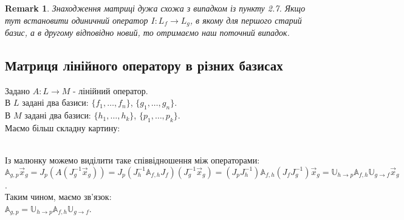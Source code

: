 \documentclass[a4paper, 10pt]{article}
\theoremstyle{theoremdd}
\newtheorem{remark}[theorem]{Remark}
\begin{document}
\begin{remark}
Знаходження матриці дужа схожа з випадком із пункту 2.7. Якщо тут встановити одиничний оператор $I: L_f \to L_g$, в якому для першого старий базис, а в другому відповідно новий, то отримаємо наш поточний випадок.
\end{remark}

\subsection{Матриця лінійного оператору в різних базисах}
Задано $A: L \to M$ - лінійний оператор.\\
В $L$ задані два базиси: $\{f_1,\dots, f_n\}$, $\{g_1, \dots, g_n\}$.\\
В $M$ задані два базиси: $\{h_1,\dots, h_k\}$, $\{p_1, \dots, p_k\}$.\\
Маємо більш складну картину:\\
\\
Із малюнку можемо виділити таке співвідношення між операторами:\\
$\mathbb{A}_{g,p} \vec{x}_g = J_p(A(J_g^{-1} \vec{x}_g)) = J_p(J_h^{-1} \mathbb{A}_{f,h} J_f)(J_g^{-1} \vec{x}_g) = (J_p J_h^{-1}) \mathbb{A}_{f,h} (J_f J_g^{-1})\vec{x}_g = \mathbb{U}_{h \to p} \mathbb{A}_{f,h} \mathbb{U}_{g \to f} \vec{x}_g$.\\
Таким чином, маємо зв'язок:\\
$\mathbb{A}_{g,p} = \mathbb{U}_{h \to p} \mathbb{A}_{f,h} \mathbb{U}_{g \to f}$.
\end{document}
